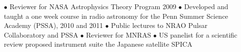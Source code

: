 \begin{description}%
\parskip0pt


\item \aguirreBGPS
\item \limaCounts

\item \jacobsNewSource
\item \parsonsSensitivity
\item \parsonsPAPEREight



\end{description}
{

}
\noindent %
$\bullet$ Reviewer for NASA Astrophysics Theory Program 2009
$\bullet$ Developed and taught a one week course in radio astronomy
for the Penn Summer Science Academy (PSSA), 2010 and 2011 $\bullet$
Public lectures to NRAO Pulsar Collaboratory and PSSA $\bullet$
Reviewer for MNRAS $\bullet$ US panelist for a scientific review
proposed instrument suite the Japanese satellite SPICA

